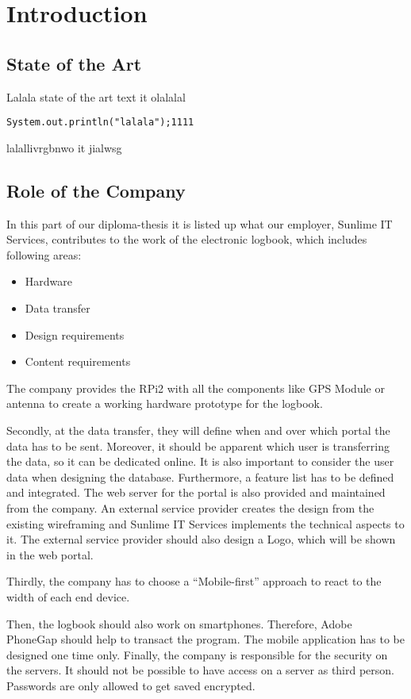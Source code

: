\newpage
\chapter*{Introduction}
\section*{State of the Art}
Lalala state of the art text \gls{it} olalalal
\begin{verbatim}
System.out.println("lalala");1111
\end{verbatim}
lalallivrgbnwo \gls{it} jialwsg
\newpage
\section*{Role of the Company}
In this part of our diploma-thesis it is listed up what our employer, Sunlime IT Services, contributes to the work of the electronic logbook, which includes following areas:
\begin{itemize}
\item Hardware
\item Data transfer
\item Design requirements
\item Content requirements
\end{itemize}
The company provides the RPi2 with all the components like GPS Module or antenna to create a working hardware prototype for the logbook.

Secondly, at the data transfer, they will define when and over which portal the data has to be sent. Moreover, it should be apparent which user is transferring the data, so it can be dedicated online. It is also important to consider the user data when designing the database. Furthermore, a feature list has to be defined and integrated.
The web server for the portal is also provided and maintained from the company.
\newline \newline
An external service provider creates the design from the existing wireframing and Sunlime IT Services implements the technical aspects to it. The external service provider should also design a Logo, which will be shown in the web portal.

Thirdly, the company has to choose a “Mobile-first” approach to react to the width of each end device.

Then, the logbook should also work on smartphones. Therefore, Adobe PhoneGap should help to transact the program. The mobile application has to be designed one time only.
\newline \newline
Finally, the company is responsible for the security on the servers. It should not be possible to have access on a server as third person. Passwords are only allowed to get saved encrypted.
\newpage
